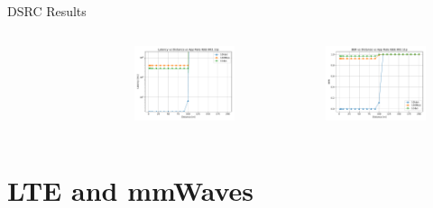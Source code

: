 \documentclass{beamer}
\begin{document}
\begin{frame}{DSRC Results}
\begin{columns}
\begin{figure}
				\end{figure}
				\begin{figure}
					\vspace{-0.1in}
					\includegraphics[scale=0.28]{latency_distance_wave_UDP}
				\end{figure}
				\begin{figure}
					\vspace{-0.2in}
					\includegraphics[scale=0.28]{BER_distance_wave_UDP}
				\end{figure}
		\end{columns}
	\end{frame}

	\section{LTE and mmWaves}
\end{document}
